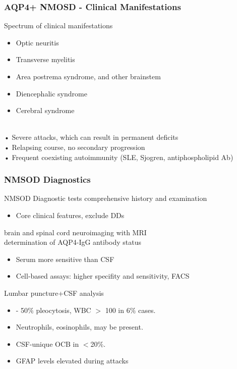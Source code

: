 \begin{itemize}
\begin{itemize}
\subsubsection{AQP4+ NMOSD - Clinical Manifestations}
Spectrum of clinical manifestations
\begin{itemize}
    \item  Optic neuritis
\item Transverse myelitis
\item Area postrema syndrome, and other brainstem
\item Diencephalic syndrome
\item Cerebral syndrome
\end{itemize}

\\• Severe attacks, which can result in permanent deficits
\\• Relapsing course, no secondary progression
\\• Frequent coexisting autoimmunity
(SLE, Sjogren, antiphospholipid Ab)

\subsubsection{NMSOD Diagnostics}
NMSOD Diagnostic tests
comprehensive history and examination
\begin{itemize}
    \item Core clinical features, exclude DDs
\end{itemize}
brain and spinal cord neuroimaging with MRI
\\determination of AQP4-IgG antibody status
\begin{itemize}
    \item Serum more sensitive than CSF
\item Cell-based assays: higher specifity and sensitivity, FACS
\end{itemize}
Lumbar puncture+CSF analysis
\begin{itemize}
    \item - 50$\%$ pleocytosis, WBC $>$ 100 in 6$\%$ cases.
\item Neutrophils, eosinophils, may be present.
\item CSF-unique OCB in $<$20$\%$.
\item GFAP levels elevated during attacks
\end{itemize}


\end{itemize}
\end{itemize}
